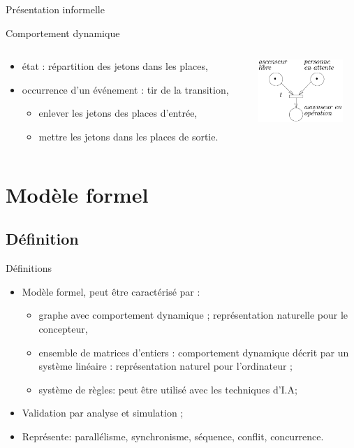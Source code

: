 \documentclass[compress]{beamer}
\begin{document}
\begin{frame}{Présentation informelle}
\begin{block}{Comportement dynamique}
\begin{columns}
	\begin{column}{.7\textwidth}
	\begin{itemize}
	\item état : répartition des jetons dans les places,
	\item occurrence d'un événement : tir de la transition,
		\begin{itemize}
		\item  enlever les jetons des places d'entrée,
		\item  mettre les jetons dans les places de sortie.
		\end{itemize}
	\end{itemize}
	\end{column}	
	\begin{column}{.3\textwidth}
		\includegraphics[width=3.2cm]{frdp}
	\end{column}
\end{columns}
\end{block}
\end{frame}

\section{Modèle formel}
\begin{frame}
\tableofcontents[hideothersubsections]
\end{frame}

\subsection{Définition}
\begin{frame}{Définitions}
\begin{itemize}
\item Modèle formel, peut être caractérisé par :
	\begin{itemize}
	\item graphe avec comportement dynamique ; représentation naturelle pour le concepteur,
	\item ensemble de matrices d'entiers : comportement dynamique décrit par un système linéaire :  représentation naturel pour l'ordinateur ;
	\item système de règles: peut être utilisé avec les techniques d'I.A;
	\end{itemize}     
\item Validation par analyse et simulation ;
\item Représente: parallélisme, synchronisme, séquence, conflit, concurrence.
\end{itemize}
\end{frame}
 
\end{document}
